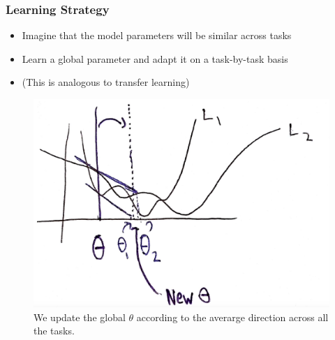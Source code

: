 \documentclass[10pt,mathserif]{beamer}
\begin{document}
\begin{frame}
  \frametitle{Learning Strategy}
 \begin{itemize}
 \item Imagine that the model parameters will be similar across tasks
 \item Learn a global parameter and adapt it on a task-by-task basis
 \item (This is analogous to transfer learning)
 \end{itemize}
\begin{figure}[ht]
  \centering
  \includegraphics[width=0.6\paperwidth]{figure/maml_learning_3}
  \caption{We update the global $\theta$ according to the averarge direction across all the tasks.
    \label{fig:maml_learning_4} }
\end{figure}
\end{frame}
\end{document}

